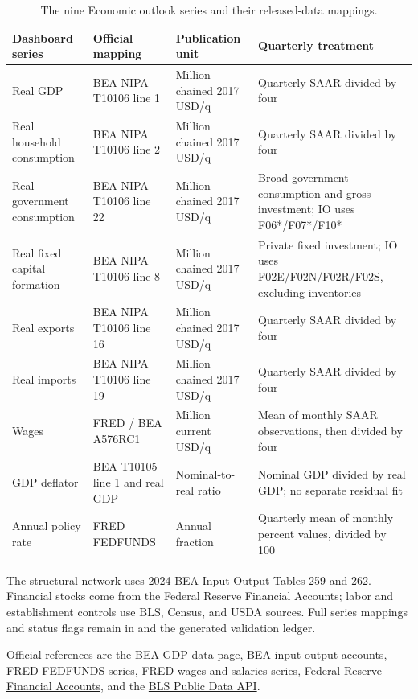 \documentclass[10pt]{article}
\begin{document}
\begin{table}[h]
\centering
\caption{The nine Economic outlook series and their released-data mappings.}
\scriptsize
\begin{tabularx}{\textwidth}{@{}>{\raggedright\arraybackslash}p{3.05cm}>{\raggedright\arraybackslash}p{3.05cm}>{\raggedright\arraybackslash}p{2.55cm}X@{}}
\toprule
Dashboard series & Official mapping & Publication unit & Quarterly treatment \\
\midrule
Real GDP & BEA NIPA T10106 line 1 & Million chained 2017 USD/q & Quarterly SAAR divided by four \\
Real household consumption & BEA NIPA T10106 line 2 & Million chained 2017 USD/q & Quarterly SAAR divided by four \\
Real government consumption & BEA NIPA T10106 line 22 & Million chained 2017 USD/q & Broad government consumption and gross investment; IO uses F06*/F07*/F10* \\
Real fixed capital formation & BEA NIPA T10106 line 8 & Million chained 2017 USD/q & Private fixed investment; IO uses F02E/F02N/F02R/F02S, excluding inventories \\
Real exports & BEA NIPA T10106 line 16 & Million chained 2017 USD/q & Quarterly SAAR divided by four \\
Real imports & BEA NIPA T10106 line 19 & Million chained 2017 USD/q & Quarterly SAAR divided by four \\
Wages & FRED / BEA A576RC1 & Million current USD/q & Mean of monthly SAAR observations, then divided by four \\
GDP deflator & BEA T10105 line 1 and real GDP & Nominal-to-real ratio & Nominal GDP divided by real GDP; no separate residual fit \\
Annual policy rate & FRED FEDFUNDS & Annual fraction & Quarterly mean of monthly percent values, divided by 100 \\
\bottomrule
\end{tabularx}
\end{table}

The structural network uses 2024 BEA Input-Output Tables 259 and 262.
Financial stocks come from the Federal Reserve Financial Accounts; labor and
establishment controls use BLS, Census, and USDA sources. Full series mappings
and status flags remain in  and the generated
validation ledger.

Official references are the
\href{https://www.bea.gov/data/gdp/gross-domestic-product}{BEA GDP data page},
\href{https://www.bea.gov/industry/input-output-accounts-data}{BEA input-output accounts},
\href{https://fred.stlouisfed.org/series/FEDFUNDS}{FRED FEDFUNDS series},
\href{https://fred.stlouisfed.org/series/A576RC1}{FRED wages and salaries series},
\href{https://www.federalreserve.gov/releases/z1/}{Federal Reserve Financial Accounts},
and the \href{https://www.bls.gov/developers/}{BLS Public Data API}.
\end{document}
